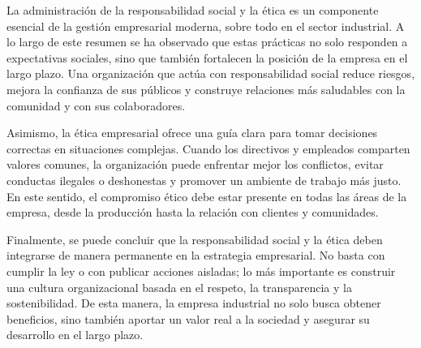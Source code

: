 La administración de la responsabilidad social y la ética es un componente esencial de la gestión empresarial moderna, sobre todo en el sector industrial. A lo largo de este resumen se ha observado que estas prácticas no solo responden a expectativas sociales, sino que también fortalecen la posición de la empresa en el largo plazo. Una organización que actúa con responsabilidad social reduce riesgos, mejora la confianza de sus públicos y construye relaciones más saludables con la comunidad y con sus colaboradores.

Asimismo, la ética empresarial ofrece una guía clara para tomar decisiones correctas en situaciones complejas. Cuando los directivos y empleados comparten valores comunes, la organización puede enfrentar mejor los conflictos, evitar conductas ilegales o deshonestas y promover un ambiente de trabajo más justo. En este sentido, el compromiso ético debe estar presente en todas las áreas de la empresa, desde la producción hasta la relación con clientes y comunidades.

Finalmente, se puede concluir que la responsabilidad social y la ética deben integrarse de manera permanente en la estrategia empresarial. No basta con cumplir la ley o con publicar acciones aisladas; lo más importante es construir una cultura organizacional basada en el respeto, la transparencia y la sostenibilidad. De esta manera, la empresa industrial no solo busca obtener beneficios, sino también aportar un valor real a la sociedad y asegurar su desarrollo en el largo plazo.
